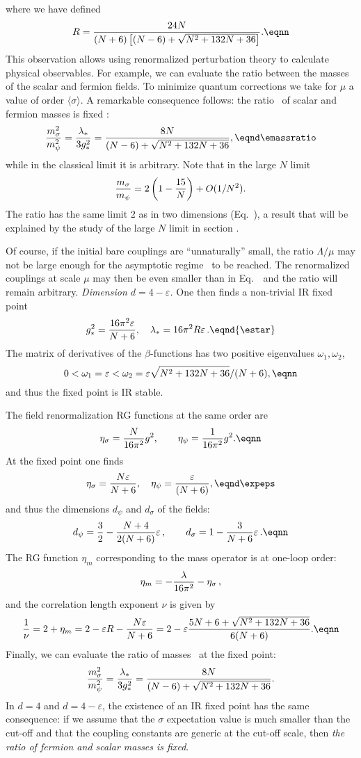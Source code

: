 where we have defined
$$R={24 N\over ( N+6)\left[( N-6)+\sqrt{ N^2+132N+36}\right]}.
\eqnn $$
This observation allows using renormalized perturbation theory to calculate
physical observables. For example, we can evaluate the ratio between the
masses of the scalar and fermion fields. To minimize quantum corrections we take  for $\mu$ a value of order $\langle \sigma\rangle$. A remarkable consequence
follows: the ratio \eratiobf~of scalar and fermion masses is fixed :
$${m^2_{\sigma}\over m^2_{\psi}}={\lambda_* \over
3g_*^2}={8N\over ( N-6)+\sqrt{ N^2+132N+36} }, \eqnd\emassratio $$
while in the classical limit it is arbitrary. Note that in the large $N$ limit
$${m _ \sigma \over m _ \psi }=2\left(1-\frac{15}{N}\right) +O(1/N^2).$$
The ratio has the same limit 2 as in two dimensions (Eq.~\eGNspec), a result that will be
explained by the study of the large $N$ limit in section \label{\sssGNYN}.
\par
Of course, if
the initial bare couplings are ``unnaturally'' small, the ratio
$\Lambda/\mu$ may not be large enough for the asymptotic regime
\eGNYgrunas\ to be reached. The renormalized couplings at scale
$\mu$ may then be even smaller than in Eq.~\eGNYgrunas\ and the
ratio will remain arbitrary.
\smallskip
{\it Dimension $d=4-\varepsilon$.}
One then finds a non-trivial IR fixed point
$$g_*^{2}={16\pi^2\varepsilon \over N +6},\quad \lambda_*=16\pi^2
R\varepsilon \,.\eqnd{\estar}$$
The  matrix of derivatives of the $\beta$-functions has two positive
eigenvalues $\omega _1,\omega _2$,
$$0<\omega_1=\varepsilon < \omega_2=\varepsilon
\sqrt{N^2+132N +36}/(N +6),
\eqnn $$
and thus the fixed point is IR stable.
\par
The field renormalization RG functions at the same order are
$$\eta_{\sigma}={N\over 16\pi^2}  g^2,\qquad
\eta_{\psi}= {1 \over 16\pi^2}  g^2 .\eqnn $$
At the fixed point one finds
$$\eta_{\sigma}={N\varepsilon\over N+6},\quad \eta_{\psi}={\varepsilon
\over (N+6)} , \eqnd\expeps $$
and thus the dimensions $d_\psi$ and $d_\sigma$ of the fields:
$$d_\psi={3\over2}-{N+4 \over2(N+6)}\varepsilon\,,\qquad
d_\sigma=1-{3\over N+6}\varepsilon\,. \eqnn $$
The  RG function $\eta_m$ corresponding
to the mass operator is at one-loop order:
$$\eta_m=-{\lambda \over 16\pi^2}-\eta_{\sigma}\,,$$
and the correlation length exponent $\nu$ is given by %
$${1\over\nu}=2+\eta_m =2- \varepsilon R-  {N\varepsilon\over N+6}=  2-\varepsilon{5N+6+\sqrt{N^2+132N+36}
\over6(N+6)}.\eqnn $$Finally, we can evaluate the ratio of masses
\eratiobf\ at the fixed point:
$${m^2_{\sigma}\over m^2_{\psi}}={\lambda_* \over
3g_*^2}={8N\over (N-6)+\sqrt{N^2+132N+36}} .$$
In $d=4$ and $d=4-\varepsilon$, the existence of an IR fixed point has the
same consequence: if we assume that the $\sigma$ expectation value is much
smaller than the cut-off and that the coupling
constants are generic at the cut-off scale, then {\it the ratio  of fermion
and scalar masses is fixed}.
%
